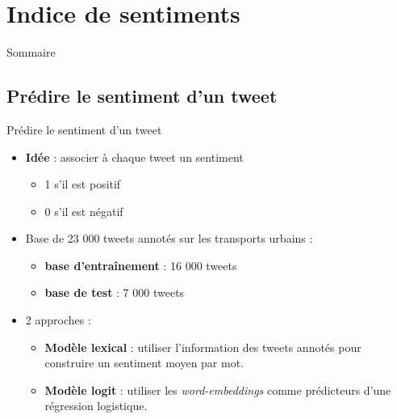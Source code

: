 \documentclass[10pt,xcolor=table,color={dvipsnames,usenames},ignorenonframetext,usepdftitle=false,french]{beamer}
\providecommand{\tightlist}{%
  \setlength{\parskip}{0pt}
  }
\begin{document}
\hypertarget{indice-de-sentiments}{%
\section{Indice de sentiments}\label{indice-de-sentiments}}

\begin{frame}{Sommaire}
\protect\hypertarget{sommaire-2}{}


\end{frame}

\hypertarget{pruxe9dire-le-sentiment-dun-tweet}{%
\subsection{Prédire le sentiment d'un
tweet}\label{pruxe9dire-le-sentiment-dun-tweet}}

\begin{frame}{Prédire le sentiment d'un tweet}
\protect\hypertarget{pruxe9dire-le-sentiment-dun-tweet-1}{}

\begin{itemize}
\tightlist
\item
  \textbf{Idée} : associer à chaque tweet un sentiment

  \begin{itemize}
  \tightlist
  \item
    1 s'il est positif
  \item
    0 s'il est négatif
  \end{itemize}
\end{itemize}

\medskip

\begin{itemize}
\tightlist
\item
  Base de 23 000 tweets annotés sur les transports urbains :

  \begin{itemize}
  \tightlist
  \item
    \textbf{base d'entraînement} : 16 000 tweets
  \item
    \textbf{base de test} : 7 000 tweets
  \end{itemize}
\end{itemize}

\medskip

\begin{itemize}
\tightlist
\item
  2 approches :

  \begin{itemize}
  \tightlist
  \item
    \textbf{Modèle lexical} : utiliser l'information des tweets annotés
    pour construire un sentiment moyen par mot.
  \item
    \textbf{Modèle logit} : utiliser les \emph{word-embeddings} comme
    prédicteurs d'une régression logistique.
  \end{itemize}
\end{itemize}

\end{frame}
\end{document}
